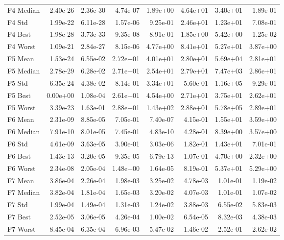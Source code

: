 \documentclass[12pt,a4paper]{article}
\begin{document}
\begin{table}[H]
{{\begin{tabular}{lrrrrrrr}
      F4 Median & 2.40e-26 & 2.36e-30 & 4.74e-07 & 1.89e+00 & 4.64e+01 & 3.40e+01 & 1.89e-01 \\
      F4 Std & 1.99e-22 & 6.11e-28 & 1.57e-06 & 9.25e-01 & 2.46e+01 & 1.23e+01 & 7.08e-01 \\
      F4 Best & 1.98e-28 & 3.73e-33 & 9.35e-08 & 8.91e-01 & 1.85e+00 & 5.42e+00 & 1.25e-02 \\
      F4 Worst & 1.09e-21 & 2.84e-27 & 8.15e-06 & 4.77e+00 & 8.41e+01 & 5.27e+01 & 3.87e+00 \\
      \midrule
      F5 Mean & 1.53e-24 & 6.55e-02 & 2.72e+01 & 4.01e+01 & 2.80e+01 & 5.69e+04 & 2.81e+01 \\
      F5 Median & 2.78e-29 & 6.28e-02 & 2.71e+01 & 2.54e+01 & 2.79e+01 & 7.47e+03 & 2.86e+01 \\
      F5 Std & 6.35e-24 & 4.38e-02 & 8.14e-01 & 3.34e+01 & 5.60e-01 & 1.16e+05 & 9.29e-01 \\
      F5 Best & 0.00e+00 & 1.08e-04 & 2.61e+01 & 4.54e+00 & 2.71e+01 & 3.75e+01 & 2.62e+01 \\
      F5 Worst & 3.39e-23 & 1.63e-01 & 2.88e+01 & 1.43e+02 & 2.88e+01 & 5.78e+05 & 2.89e+01 \\
      \midrule
      F6 Mean & 2.31e-09 & 8.85e-05 & 7.05e-01 & 7.40e-07 & 4.15e-01 & 1.55e+01 & 3.59e+00 \\
      F6 Median & 7.91e-10 & 8.01e-05 & 7.45e-01 & 4.83e-10 & 4.28e-01 & 8.39e+00 & 3.57e+00 \\
      F6 Std & 4.61e-09 & 3.63e-05 & 3.90e-01 & 3.03e-06 & 1.82e-01 & 1.43e+01 & 7.01e-01 \\
      F6 Best & 1.43e-13 & 3.20e-05 & 9.35e-05 & 6.79e-13 & 1.07e-01 & 4.70e+00 & 2.32e+00 \\
      F6 Worst & 2.34e-08 & 2.05e-04 & 1.48e+00 & 1.64e-05 & 8.19e-01 & 5.37e+01 & 5.29e+00 \\
      \midrule
      F7 Mean & 3.86e-04 & 2.26e-04 & 1.98e-03 & 3.25e-02 & 4.78e-03 & 1.01e-01 & 1.19e-02 \\
      F7 Median & 3.82e-04 & 1.81e-04 & 1.65e-03 & 3.20e-02 & 4.07e-03 & 1.01e-01 & 1.07e-02 \\
      F7 Std & 1.99e-04 & 1.49e-04 & 1.31e-03 & 1.24e-02 & 3.88e-03 & 6.55e-02 & 5.83e-03 \\
      F7 Best & 2.52e-05 & 3.06e-05 & 4.26e-04 & 1.00e-02 & 6.54e-05 & 8.32e-03 & 4.38e-03 \\
      F7 Worst & 8.45e-04 & 6.35e-04 & 6.96e-03 & 5.47e-02 & 1.46e-02 & 2.52e-01 & 2.62e-02 \\
      \midrule
      \bottomrule
    \end{tabular}
  }%
}%

\end{table}
\end{document}
